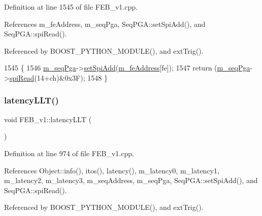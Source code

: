 Definition at line 1545 of file F\+E\+B\+\_\+v1.\+cpp.



References m\+\_\+fe\+Address, m\+\_\+seq\+Pga, Seq\+P\+G\+A\+::set\+Spi\+Add(), and Seq\+P\+G\+A\+::spi\+Read().



Referenced by B\+O\+O\+S\+T\+\_\+\+P\+Y\+T\+H\+O\+N\+\_\+\+M\+O\+D\+U\+L\+E(), and ext\+Trig().


\begin{DoxyCode}
1545                                        \{
1546   \hyperlink{classFEB__v1_a6c7804ac86796f233a8393043adf2e77}{m\_seqPga}->\hyperlink{classSeqPGA_ac998ce3a6d9b5f2e88cc8393f8c1df53}{setSpiAdd}(\hyperlink{classFEB__v1_a4e1945c2d5b434125f375e9d0fc6d99f}{m\_feAddress}[fe]);
1547   \textcolor{keywordflow}{return} (\hyperlink{classFEB__v1_a6c7804ac86796f233a8393043adf2e77}{m\_seqPga}->\hyperlink{classSeqPGA_ab3d0e5e5d4014bc7a92588a76b8713d4}{spiRead}(14+ch)&0x3F);
1548 \}
\end{DoxyCode}
\mbox{\label{classFEB__v1_a42cc3f61fd94d4de68eb605b04fb1e74}} 
\subsubsection{\texorpdfstring{latency\+L\+L\+T()}{latencyLLT()}}
{\footnotesize\ttfamily void F\+E\+B\+\_\+v1\+::latency\+L\+LT (\begin{DoxyParamCaption}{ }\end{DoxyParamCaption})}



Definition at line 974 of file F\+E\+B\+\_\+v1.\+cpp.



References Object\+::info(), itos(), latency(), m\+\_\+latency0, m\+\_\+latency1, m\+\_\+latency2, m\+\_\+latency3, m\+\_\+seq\+Address, m\+\_\+seq\+Pga, Seq\+P\+G\+A\+::set\+Spi\+Add(), and Seq\+P\+G\+A\+::spi\+Read().



Referenced by B\+O\+O\+S\+T\+\_\+\+P\+Y\+T\+H\+O\+N\+\_\+\+M\+O\+D\+U\+L\+E(), and ext\+Trig().


